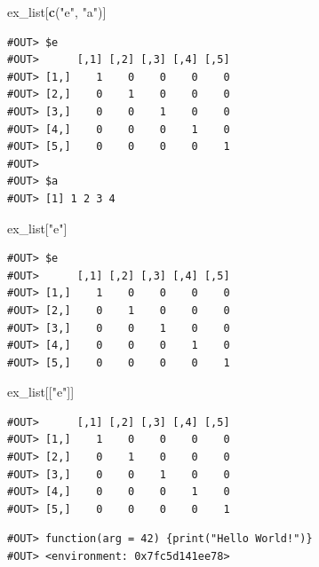 \documentclass[]{book}
\newenvironment{Shaded}{\begin{snugshade}}{\end{snugshade}}
\newcommand{\KeywordTok}[1]{\textcolor[rgb]{0.13,0.29,0.53}{\textbf{#1}}}
\newcommand{\NormalTok}[1]{#1}
\newcommand{\OperatorTok}[1]{\textcolor[rgb]{0.81,0.36,0.00}{\textbf{#1}}}
\newcommand{\StringTok}[1]{\textcolor[rgb]{0.31,0.60,0.02}{#1}}
\begin{document}
\begin{Shaded}
\begin{Highlighting}[]
\NormalTok{ex_list[}\KeywordTok{c}\NormalTok{(}\StringTok{"e"}\NormalTok{, }\StringTok{"a"}\NormalTok{)]}
\end{Highlighting}
\end{Shaded}

\begin{verbatim}
#OUT> $e
#OUT>      [,1] [,2] [,3] [,4] [,5]
#OUT> [1,]    1    0    0    0    0
#OUT> [2,]    0    1    0    0    0
#OUT> [3,]    0    0    1    0    0
#OUT> [4,]    0    0    0    1    0
#OUT> [5,]    0    0    0    0    1
#OUT> 
#OUT> $a
#OUT> [1] 1 2 3 4
\end{verbatim}

\begin{Shaded}
\begin{Highlighting}[]
\NormalTok{ex_list[}\StringTok{"e"}\NormalTok{]}
\end{Highlighting}
\end{Shaded}

\begin{verbatim}
#OUT> $e
#OUT>      [,1] [,2] [,3] [,4] [,5]
#OUT> [1,]    1    0    0    0    0
#OUT> [2,]    0    1    0    0    0
#OUT> [3,]    0    0    1    0    0
#OUT> [4,]    0    0    0    1    0
#OUT> [5,]    0    0    0    0    1
\end{verbatim}

\begin{Shaded}
\begin{Highlighting}[]
\NormalTok{ex_list[[}\StringTok{"e"}\NormalTok{]]}
\end{Highlighting}
\end{Shaded}

\begin{verbatim}
#OUT>      [,1] [,2] [,3] [,4] [,5]
#OUT> [1,]    1    0    0    0    0
#OUT> [2,]    0    1    0    0    0
#OUT> [3,]    0    0    1    0    0
#OUT> [4,]    0    0    0    1    0
#OUT> [5,]    0    0    0    0    1
\end{verbatim}

\begin{Shaded}
\end{Shaded}

\begin{verbatim}
#OUT> function(arg = 42) {print("Hello World!")}
#OUT> <environment: 0x7fc5d141ee78>
\end{verbatim}
\end{document}

